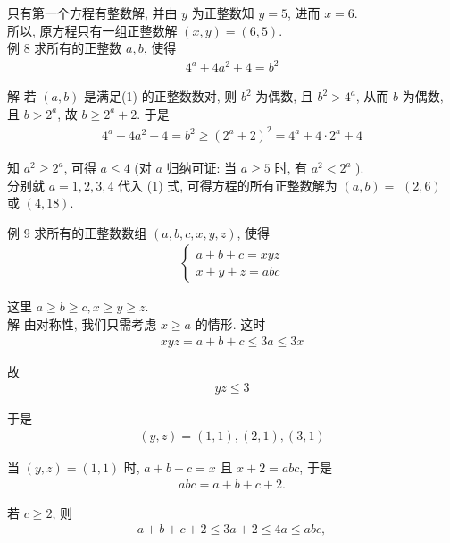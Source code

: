 	只有第一个方程有整数解, 并由 $y$ 为正整数知 $y=5$, 进而 $x=6$.\\
	所以, 原方程只有一组正整数解 $(x, y)=(6,5)$.\\
	例 8 求所有的正整数 $a ,  b$, 使得
\begin{align*}
		4^{a}+4 a^{2}+4=b^{2}
	\end{align*}

	解 若 $(a ,  b)$ 是满足(1) 的正整数数对, 则 $b^{2}$ 为偶数, 且 $b^{2}>4^{a}$, 从而 $b$ 为偶数, 且 $b>2^{a}$, 故 $b \geqslant 2^{a}+2$. 于是
\begin{align*}
		4^{a}+4 a^{2}+4=b^{2} \geqslant\left(2^{a}+2\right)^{2}=4^{a}+4 \cdot 2^{a}+4
	\end{align*}

	知 $a^{2} \geqslant 2^{a}$, 可得 $a \leqslant 4$ (对 $a$ 归纳可证: 当 $a \geqslant 5$ 时, 有 $a^{2}<2^{a}$ ).\\
	分别就 $a=1,2,3,4$ 代入 (1) 式, 可得方程的所有正整数解为 $(a, b)=$ $(2,6)$ 或 $(4,18)$.

	例 9 求所有的正整数数组 $(a, b, c, x, y, z)$, 使得
\begin{align*}
		\left\{\begin{array}{l}
			       a+b+c=x y z \\
			       x+y+z=a b c
		       \end{array}\right.
	\end{align*}

	这里 $a \geqslant b \geqslant c, x \geqslant y \geqslant z$.\\
	解 由对称性, 我们只需考虑 $x \geqslant a$ 的情形. 这时
\begin{align*}
		x y z=a+b+c \leqslant 3 a \leqslant 3 x
	\end{align*}

	故
\begin{align*}
		y z \leqslant 3
	\end{align*}

	于是
\begin{align*}
		(y, z)=(1,1),(2,1),(3,1)
	\end{align*}

	当 $(y, z)=(1,1)$ 时, $a+b+c=x$ 且 $x+2=a b c$, 于是
\begin{align*}
		a b c=a+b+c+2 .
	\end{align*}

	若 $c \geqslant 2$, 则
\begin{align*}
		a+b+c+2 \leqslant 3 a+2 \leqslant 4 a \leqslant a b c,
	\end{align*}

